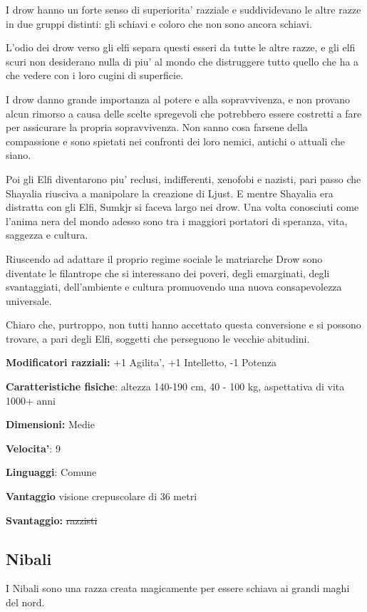 \documentclass[a4paper,11pt,twoside,openany]{dndbook}
\begin{document}
I drow hanno un forte senso di superiorita' razziale e suddividevano le altre razze in due gruppi distinti: gli schiavi e coloro che non sono ancora schiavi.

L'odio dei drow verso gli elfi separa questi esseri da tutte le altre razze, e gli elfi scuri non desiderano nulla di piu' al mondo che distruggere tutto quello che ha a che vedere con i loro cugini di superficie.

I drow danno grande importanza al potere e alla sopravvivenza, e non provano alcun rimorso a causa delle scelte spregevoli che potrebbero essere costretti a fare per assicurare la propria sopravvivenza. Non sanno cosa farsene della compassione e sono spietati nei confronti dei loro nemici, antichi o attuali che siano.

Poi gli Elfi diventarono piu' reclusi, indifferenti, xenofobi e nazisti, pari passo che Shayalia riusciva a manipolare la creazione di Ljust. E mentre Shayalia era distratta con gli Elfi, Sumkjr si faceva largo nei drow. Una volta conosciuti come l'anima nera del mondo adesso sono tra i maggiori portatori di speranza, vita, saggezza e cultura.

Riuscendo ad adattare il proprio regime sociale le matriarche Drow sono diventate le filantrope che si interessano dei poveri, degli emarginati, degli svantaggiati, dell'ambiente e cultura promuovendo una nuova consapevolezza universale.

Chiaro che, purtroppo, non tutti hanno accettato questa conversione e si possono trovare, a pari degli Elfi, soggetti che perseguono le vecchie abitudini.

\textbf{Modificatori razziali:} +1 Agilita', +1 Intelletto, -1 Potenza

\textbf{Caratteristiche fisiche}: altezza 140-190 cm, 40 - 100 kg,
aspettativa di vita 1000+ anni

\textbf{Dimensioni:} Medie

\textbf{Velocita'}: 9

\textbf{Linguaggi}: Comune

\textbf{Vantaggio} visione crepuscolare di 36 metri

\textbf{Svantaggio:} \sout{razzisti}

\subsection{Nibali}

\label{nibali}

I Nibali sono una razza creata magicamente per essere schiava ai grandi maghi del nord.
\end{document}
